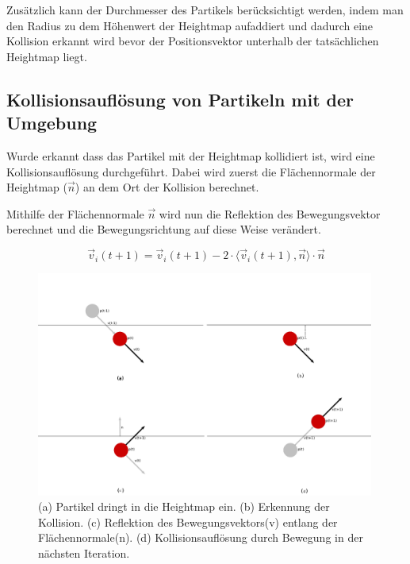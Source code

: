 \begin{Spacing}{\mylinespace}
    	Zusätzlich kann der Durchmesser des Partikels berücksichtigt werden,
    	indem man den Radius zu dem Höhenwert der Heightmap aufaddiert und
    	dadurch eine Kollision erkannt wird bevor der Positionsvektor unterhalb
    	der tatsächlichen Heightmap liegt.

    \subsection{Kollisionsauflösung von Partikeln mit der Umgebung}
    	Wurde erkannt dass das Partikel mit der Heightmap kollidiert ist, wird eine
    	Kollisionsauflösung durchgeführt. Dabei wird zuerst die Flächennormale
    	der Heightmap ($\vec{n}$) an dem Ort der Kollision berechnet.


    	Mithilfe der Flächennormale $\vec{n}$ wird nun die Reflektion des Bewegungsvektor
    	berechnet und die Bewegungsrichtung auf diese Weise verändert.

    	\[ \vec{v}_{i}(t+1) = \vec{v}_{i}(t+1) -2 \cdot \langle \vec{v}_{i}(t+1) , \vec{n} \rangle \cdot \vec{n} \]

		\begin{figure}[h!]
			\includegraphics[width=0.99\textwidth]{graphics/Phys_kh1234.png}
			\caption{(a) Partikel dringt in die Heightmap ein. (b) Erkennung der Kollision. (c) Reflektion des Bewegungsvektors(v) entlang der Flächennormale(n). (d) Kollisionsauflösung durch Bewegung in der nächsten Iteration. }
			\label{fig:reflexHeihtmap}
		\end{figure}


\end{Spacing}
